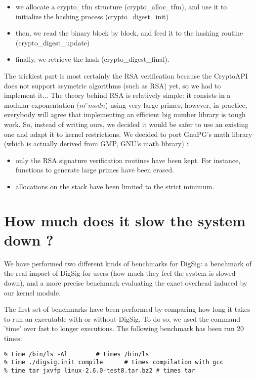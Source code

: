 \documentclass{article}
\begin{document}
\begin{itemize} 
\item we allocate a crypto\_tfm structure (crypto\_alloc\_tfm), and use
  it to initialize the hashing process (crypto\_digest\_init)
\item then, we read the binary block by block, and feed it to the hashing
  routine (crypto\_digest\_update)
\item finally, we retrieve the hash (crypto\_digest\_final).
\end{itemize} 
The trickiest part is most certainly the RSA verification because
the CryptoAPI does not support asymetric algorithms (such as RSA) yet,
so we had to implement it... The theory behind RSA is relatively
simple: it consists in a modular exponentation ($m^e mod n$) using
very large primes, however, in practice, everybody will agree that 
implementing an efficient big number library is tough work. 
So, instead of writing ours, we decided it would be safer to use
an existing one and adapt it to kernel restrictions.
We decided to port GnuPG's math library (which is
actually derived from GMP, GNU's math library) \cite{GnuPG}:
\begin{itemize} 
\item only the RSA signature verification routines have been kept. 
  For instance, functions to generate large primes have been erased.
\item allocations on the stack have been limited to the strict minimum.
\end{itemize} 

\section{How much does it slow the system down ?} 

We have performed two different kinds of benchmarks for DigSig: 
a benchmark of the real impact of DigSig for users (how much they
feel the system is slowed down), and a more precise benchmark
evaluating the exact overhead induced by our kernel module.

The first set of benchmarks have been performed by comparing
how long it takes to run an executable with or without DigSig.
To do so, we used the command 'time' over fast to longer executions. 
The following benchmark has been run 20 times:

\begin{verbatim} 
% time /bin/ls -Al		  # times /bin/ls
% time ./digsig.init compile      # times compilation with gcc
% time tar jxvfp linux-2.6.0-test8.tar.bz2 # times tar
\end{verbatim} 
\end{document}
